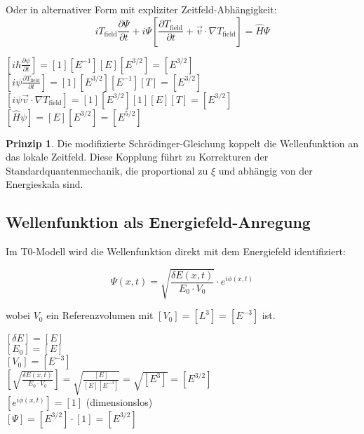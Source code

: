 \documentclass[12pt,a4paper]{article}
\newcommand{\tfield}{T_{\text{field}}}
\newcommand{\dfield}{\delta E}
\theoremstyle{definition}
\newtheorem{prinzip}{Prinzip}
\begin{document}
Oder in alternativer Form mit expliziter Zeitfeld-Abhängigkeit:
\begin{equation}
	\boxed{i \tfield \frac{\partial\Psi}{\partial t} + i\Psi\left[\frac{\partial \tfield}{\partial t} + \vec{v} \cdot \nabla \tfield\right] = \hat{H}\Psi}
\end{equation}

\begin{einheitencheck}
	$[i \hbar \frac{\partial\psi}{\partial t}] = [1][E^{-1}][E][E^{3/2}] = [E^{3/2}]$\\
	$[i\psi\frac{\partial \tfield}{\partial t}] = [1][E^{3/2}][E^{-1}][T] = [E^{3/2}]$\\
	$[i\psi\vec{v} \cdot \nabla \tfield] = [1][E^{3/2}][1][E][T] = [E^{3/2}]$\\
	$[\hat{H}\psi] = [E][E^{3/2}] = [E^{5/2}]$ \checkmark
\end{einheitencheck}

\begin{prinzip}
	Die modifizierte Schrödinger-Gleichung koppelt die Wellenfunktion an das lokale Zeitfeld. Diese Kopplung führt zu Korrekturen der Standardquantenmechanik, die proportional zu $\xi$ und abhängig von der Energieskala sind.
\end{prinzip}

\subsection{Wellenfunktion als Energiefeld-Anregung}

Im T0-Modell wird die Wellenfunktion direkt mit dem Energiefeld identifiziert:

\begin{equation}
	\Psi(x,t) = \sqrt{\frac{\dfield(x,t)}{E_0 \cdot V_0}} \cdot e^{i\phi(x,t)}
\end{equation}

wobei $V_0$ ein Referenzvolumen mit $[V_0] = [L^3] = [E^{-3}]$ ist.

\begin{einheitencheck}
	$[\dfield] = [E]$\\
	$[E_0] = [E]$\\
	$[V_0] = [E^{-3}]$\\
	$[\sqrt{\frac{\dfield(x,t)}{E_0 \cdot V_0}}] = \sqrt{\frac{[E]}{[E][E^{-3}]}} = \sqrt{[E^3]} = [E^{3/2}]$\\
	$[e^{i\phi(x,t)}] = [1]$ (dimensionslos)\\
	$[\Psi] = [E^{3/2}] \cdot [1] = [E^{3/2}]$ \checkmark
\end{einheitencheck}
\end{document}
